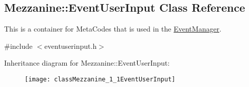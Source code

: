 \hypertarget{classMezzanine_1_1EventUserInput}{
\subsection{Mezzanine::EventUserInput Class Reference}
\label{classMezzanine_1_1EventUserInput}
}


This is a container for MetaCodes that is used in the \hyperlink{classMezzanine_1_1EventManager}{EventManager}.  




{\ttfamily \#include $<$eventuserinput.h$>$}

Inheritance diagram for Mezzanine::EventUserInput:\begin{figure}[H]
\begin{center}
\leavevmode
\texttt{[image: classMezzanine\_1\_1EventUserInput]}
\end{center}
\end{figure}
